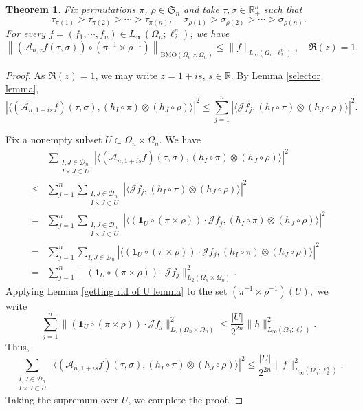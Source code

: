 \documentclass{amsart}
\numberwithin{equation}{section}
\newtheorem{thm}{Theorem}[section]
\theoremstyle{definition}
\theoremstyle{remark}
\newcommand{\1}{\mathbf 1}
\newcommand{\BMO}{\mathrm{BMO}}
\begin{document}
\begin{thm}\label{thm:right}
Fix permutations $\pi$, $\rho\in\mathfrak{S}_n$ and take $\tau,\sigma\in\mathbb{R}^n_+$ such that
$$\tau_{\pi(1)}>\tau_{\pi(2)}>\cdots>\tau_{\pi(n)},\quad \sigma_{\rho(1)}>\sigma_{\rho(2)}>\cdots>\sigma_{\rho(n)}.$$
For  every $f=(f_1,\cdots,f_n)\in L_{\infty}(\Omega_n;\ell^n_2)$, we have
\begin{equation}\label{eq:right-boundary-bmo-bound}
\left\|\left(\mathcal{A}_{n,z}f(\tau,\sigma)\right)\circ(\pi^{-1}\times\rho^{-1})\right\|_{\BMO(\Omega_n\times\Omega_n)}
\leq\|f\|_{L_{\infty}(\Omega_n;\ell^{n}_{2})},\quad \Re(z)=1.
\end{equation}
\end{thm}
\begin{proof} 
	As  $\Re(z)=1$, we may write $z=1+is$, $s\in\mathbb{R}$.  By Lemma \ref{selector lemma}, 
$$|\langle(\mathcal{A}_{n,1+is}f)(\tau,\sigma),(h_I\circ\pi)\otimes(h_J\circ\rho)\rangle|^2\leq\sum_{j=1}^n|\langle \mathcal{J}f_j,(h_I\circ\pi)\otimes(h_J\circ\rho)\rangle|^2.$$

Fix a nonempty subset $U\subset \Omega_n\times\Omega_n.$ We have
\begin{align*}
&\sum_{\substack{I,J\in\mathcal{D}_n\\ I\times J \subset U}}|\langle(\mathcal{A}_{n,1+is}f)(\tau,\sigma),(h_I\circ\pi)\otimes(h_J\circ\rho)\rangle|^2\\
\leq&\sum_{j=1}^n\sum_{\substack{I,J\in\mathcal{D}_n\\ I\times J \subset U}}|\langle \mathcal{J}f_j,(h_I\circ\pi)\otimes(h_J\circ\rho)\rangle|^2\\
=&\sum_{j=1}^n\sum_{\substack{I,J\in\mathcal{D}_n\\ I\times J \subset U}}|\langle(\1_U\circ(\pi\times\rho))\cdot \mathcal{J}f_j,(h_I\circ\pi)\otimes(h_J\circ\rho)\rangle|^2\\
=&\sum_{j=1}^n\sum_{I,J\in{\mathcal{D}}_n}|\langle(\1_U\circ(\pi\times\rho))\cdot \mathcal{J}f_j,(h_I\circ\pi)\otimes(h_J\circ\rho)\rangle|^2\\
=&\sum_{j=1}^n\|(\1_U\circ(\pi\times\rho))\cdot \mathcal{J}f_j\|_{L_2(\Omega_n\times\Omega_n)}^2.
\end{align*}
Applying Lemma \ref{getting rid of U lemma} to the set $(\pi^{-1}\times\rho^{-1})(U),$ we write
$$\sum_{j=1}^n\|(\1_U\circ(\pi\times\rho))\cdot \mathcal{J}f_j\|_{L_2(\Omega_n\times\Omega_n)}^2\leq\frac{|U|}{2^{2n}}\|h\|_{L_{\infty}(\Omega_n;\ell^n_2)}^2.$$
Thus,
$$\sum_{\substack{I,J\in\mathcal{D}_n\\ I\times J \subset U}}|\langle(\mathcal{A}_{n,1+is}f)(\tau,\sigma),(h_I\circ\pi)\otimes(h_J\circ\rho)\rangle|^2\leq\frac{|U|}{2^{2n}}\|f\|_{L_{\infty}(\Omega_n;\ell^n_2)}^2.$$
Taking the supremum over $U$, we complete the proof.
\end{proof}
\end{document}
